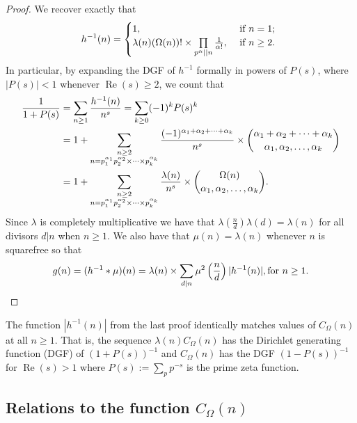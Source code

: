 \documentclass[11pt,reqno,a4letter]{article}
\numberwithin{equation}{section}
\numberwithin{figure}{section}
\numberwithin{table}{section}
\newcommand{\cf}{cf.~}
\theoremstyle{plain}
\numberwithin{theorem}{section}
\theoremstyle{definition}
\theoremstyle{remark}
\renewcommand{\Re}{\operatorname{Re}}
\newcommand{\mathtext}[1]{\text{\rm #1}}
\begin{document}
\begin{proof}
We recover exactly that \cite[\cf \S 2]{FROBERG-1968} 
\begin{equation} 
\notag 
h^{-1}(n) = \begin{cases} 
     1, & \text{ if $n = 1$; } \\ 
     \lambda(n) (\Omega(n))! \times \prod\limits_{p^{\alpha} || n} \frac{1}{\alpha!}, & 
     \text{ if $n \geq 2$. }
     \end{cases}
\end{equation} 
In particular, by expanding the DGF of 
$h^{-1}$ formally in powers of $P(s)$, where $|P(s)| < 1$ whenever $\Re(s) \geq 2$, 
we count that 
\begin{align}
\notag
\frac{1}{1+P(s)} & = \sum_{n \geq 1} \frac{h^{-1}(n)}{n^s} = \sum_{k \geq 0} (-1)^k P(s)^k \\ 
\notag
     & = 
     1 + \sum_{\substack{n \geq 2 \\ n =p_1^{\alpha_1}p_2^{\alpha_2} \times \cdots \times p_k^{\alpha_k}}} 
     \frac{(-1)^{\alpha_1+\alpha_2+\cdots+\alpha_k}}{n^s} \times 
     \binom{\alpha_1+\alpha_2+\cdots+\alpha_k}{\alpha_1,\alpha_2,\ldots,\alpha_k} \\ 
\label{eqn_COmeganMultinomExp_as_DGFSeries_v2}
     & = 
     1 + \sum_{\substack{n \geq 2 \\ n =p_1^{\alpha_1}p_2^{\alpha_2} \times \cdots \times p_k^{\alpha_k}}} 
     \frac{\lambda(n)}{n^s} \times \binom{\Omega(n)}{\alpha_1,\alpha_2,\ldots,\alpha_k}. 
\end{align}
Since $\lambda$ is completely multiplicative we have that 
$\lambda\left(\frac{n}{d}\right) \lambda(d) = \lambda(n)$ for all divisors 
$d|n$ when $n \geq 1$. We also have that $\mu(n) = \lambda(n)$ 
whenever $n$ is squarefree so that
\[
g(n) = (h^{-1} \ast \mu)(n) = \lambda(n) \times 
     \sum_{d|n} \mu^2\left(\frac{n}{d}\right) |h^{-1}(n)|, \mathtext{ for } n \geq 1. 
     \qedhere 
\]
\end{proof} 

The function $|h^{-1}(n)|$ from the last proof identically matches  
values of $C_{\Omega}(n)$ at all $n \geq 1$. 
That is, the sequence $\lambda(n) C_{\Omega}(n)$ has the 
Dirichlet generating function (DGF) of $(1 + P(s))^{-1}$ and 
$C_{\Omega}(n)$ has the DGF $(1-P(s))^{-1}$ for $\Re(s) > 1$ 
where $P(s) := \sum_p p^{-s}$ is the prime zeta function. 

\subsection{Relations to the function $C_{\Omega}(n)$} 
\label{Section_InvFunc_PreciseExpsAndAsymptotics} 
\label{subSection_Relating_CknFuncs_to_gInvn} 
\end{document}

